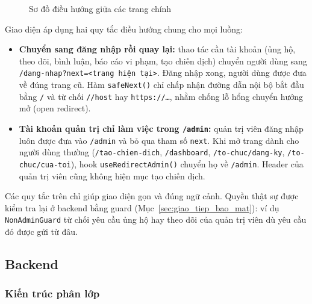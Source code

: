 \begin{figure}[htbp]
{%
    }
    \caption{Sơ đồ điều hướng giữa các trang chính}
    \label{fig:dieu_huong}
\end{figure}

Giao diện áp dụng hai quy tắc điều hướng chung cho mọi luồng:

\begin{itemize}
    \item \textbf{Chuyển sang đăng nhập rồi quay lại:} thao tác cần tài khoản (ủng hộ, theo dõi, bình luận, báo cáo vi phạm, tạo chiến dịch) chuyển người dùng sang \texttt{/dang-nhap?next=<trang hiện tại>}. Đăng nhập xong, người dùng được đưa về đúng trang cũ. Hàm \texttt{safeNext()} chỉ chấp nhận đường dẫn nội bộ bắt đầu bằng \texttt{/} và từ chối \texttt{//host} hay \texttt{https://\ldots}, nhằm chống lỗ hổng chuyển hướng mở (open redirect).
    \item \textbf{Tài khoản quản trị chỉ làm việc trong \texttt{/admin}:} quản trị viên đăng nhập luôn được đưa vào \texttt{/admin} và bỏ qua tham số \texttt{next}. Khi mở trang dành cho người dùng thường (\texttt{/tao-chien-dich}, \texttt{/dashboard}, \texttt{/to-chuc/dang-ky}, \texttt{/to-chuc/cua-toi}), hook \texttt{useRedirectAdmin()} chuyển họ về \texttt{/admin}. Header của quản trị viên cũng không hiện mục tạo chiến dịch.
\end{itemize}

Các quy tắc trên chỉ giúp giao diện gọn và đúng ngữ cảnh. Quyền thật sự được kiểm tra lại ở backend bằng guard (Mục~\ref{sec:giao_tiep_bao_mat}): ví dụ \texttt{NonAdminGuard} từ chối yêu cầu ủng hộ hay theo dõi của quản trị viên dù yêu cầu đó được gửi từ đâu.

\subsection{Backend}

\subsubsection{Kiến trúc phân lớp}

